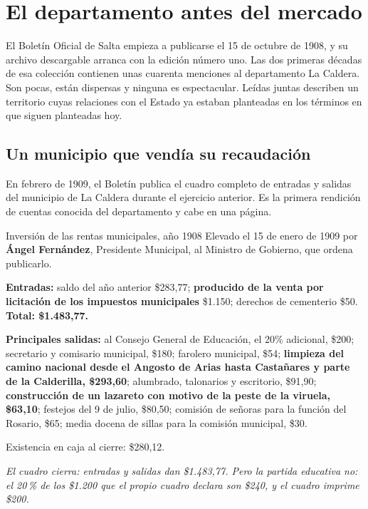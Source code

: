 \chapter{El departamento antes del mercado}

\label{cap:siglo}
El Boletín Oficial de Salta empieza a publicarse el 15 de octubre de 1908, y su archivo
descargable arranca con la edición número uno. Las dos primeras décadas de esa colección
contienen unas cuarenta menciones al departamento La Caldera. Son pocas, están dispersas y
ninguna es espectacular. Leídas juntas describen un territorio cuyas relaciones con el
Estado ya estaban planteadas en los términos en que siguen planteadas hoy.

\section{Un municipio que vendía su recaudación}

En febrero de 1909, el Boletín publica el cuadro completo de entradas y salidas del
municipio de La Caldera durante el ejercicio anterior. Es la primera rendición de cuentas
conocida del departamento y cabe en una página.

\begin{ficha}{Inversión de las rentas municipales, año 1908}
Elevado el 15 de enero de 1909 por \textbf{Ángel Fernández}, Presidente Municipal, al
Ministro de Gobierno, que ordena publicarlo.

\textbf{Entradas:} saldo del año anterior \$283,77; \textbf{producido de la venta por
licitación de los impuestos municipales} \$1.150; derechos de cementerio \$50.
\textbf{Total: \$1.483,77.}

\textbf{Principales salidas:} al Consejo General de Educación, el 20\% adicional, \$200;
secretario y comisario municipal, \$180; farolero municipal, \$54; \textbf{limpieza del
camino nacional desde el Angosto de Arias hasta Castañares y parte de la Calderilla,
\$293,60}; alumbrado, talonarios y escritorio, \$91,90; \textbf{construcción de un lazareto
con motivo de la peste de la viruela, \$63,10}; festejos del 9 de julio, \$80,50; comisión
de señoras para la función del Rosario, \$65; media docena de sillas para la comisión
municipal, \$30.

Existencia en caja al cierre: \$280,12.

\textit{El cuadro cierra: entradas y salidas dan \$1.483,77. Pero la partida educativa no:
el 20\,\% de los \$1.200 que el propio cuadro declara son \$240, y el cuadro imprime \$200.}
\end{ficha}

